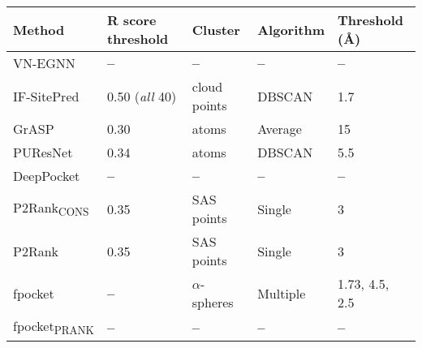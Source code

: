 \begin{landscape}
\begin{longtable}{|M{25mm}|M{29mm}|M{27mm}|M{22mm}|M{19mm}|M{19mm}|M{15mm}|M{15mm}|M{15mm}|M{16mm}|M{15mm}|M{23mm}|M{15mm}|}
\label{tab:methods_details_1}\\
\end{longtable}
\end{landscape}

\begin{landscape}
\begin{longtable}{|M{35mm}|M{45mm}|M{35mm}|M{35mm}|M{35mm}|}
\hline
\textbf{Method} & \textbf{R score threshold}  & \textbf{Cluster} & \textbf{Algorithm}   & \textbf{Threshold (\AA{})}\\ \hline
\endfirsthead
%
\endhead
%
VN-EGNN       & \textbf{--}                 & \textbf{--}            & \textbf{--}         & \textbf{--}         \\ \hline
IF-SitePred   & 0.50 (\textit{all} 40)      & cloud points & DBSCAN    & 1.7       \\ \hline
GrASP         & 0.30               & atoms        & Average   & 15        \\ \hline
PUResNet      & 0.34              & atoms        & DBSCAN    & 5.5       \\ \hline
DeepPocket    & \textbf{--}                 & \textbf{--}            & \textbf{--}         & \textbf{--}         \\ \hline
P2Rank\textsubscript{CONS}    & 0.35              & SAS points   & Single    & 3         \\ \hline
P2Rank        & 0.35              & SAS points   & Single    & 3         \\ \hline
fpocket       & \textbf{--}                 & $\alpha$-spheres   & Multiple  & 1.73, 4.5, 2.5         \\ \hline
fpocket\textsubscript{PRANK}       & \textbf{--}                 & \textbf{--}   & \textbf{--}  & \textbf{--}         \\ \hline

\end{longtable}
\end{landscape}

